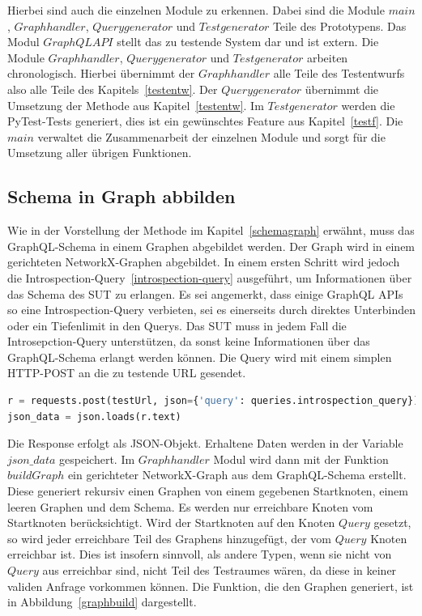 Hierbei sind auch die einzelnen Module zu erkennen.
Dabei sind die Module $main$, $Graphhandler$, $Querygenerator$ und $Testgenerator$ Teile des Prototypens.
Das Modul $GraphQL API$ stellt das zu testende System dar und ist extern.
Die Module $Graphhandler$, $Querygenerator$ und $Testgenerator$ arbeiten chronologisch.
Hierbei übernimmt der $Graphhandler$ alle Teile des Testentwurfs also alle Teile des Kapitels~\ref{testentw}.
Der $Querygenerator$ übernimmt die Umsetzung der Methode aus Kapitel~\ref{testentw}.
Im $Testgenerator$ werden die PyTest-Tests generiert, dies ist ein gewünschtes Feature aus Kapitel~\ref{testf}.
Die $main$ verwaltet die Zusammenarbeit der einzelnen Module und sorgt für die Umsetzung aller übrigen Funktionen.

\subsection{Schema in Graph abbilden}

Wie in der Vorstellung der Methode im Kapitel~\ref{schemagraph} erwähnt, muss das GraphQL-Schema in einem Graphen abgebildet werden.
Der Graph wird in einem gerichteten NetworkX-Graphen abgebildet.
In einem ersten Schritt wird jedoch die Introspection-Query~\ref{introspection-query} ausgeführt, um Informationen über das Schema des SUT zu erlangen.
Es sei angemerkt, dass einige GraphQL APIs so eine Introspection-Query verbieten, sei es einerseits durch direktes Unterbinden oder ein Tiefenlimit in den Querys.
Das SUT muss in jedem Fall die Introsepction-Query unterstützen, da sonst keine Informationen über das GraphQL-Schema erlangt werden können.
Die Query wird mit einem simplen HTTP-POST an die zu testende URL gesendet.

\begin{lstlisting}[language=Python, caption={Absenden der Introspection-Query}]
r = requests.post(testUrl, json={'query': queries.introspection_query})
json_data = json.loads(r.text)
\end{lstlisting}

Die Response erfolgt als JSON-Objekt.
Erhaltene Daten werden in der Variable $json\_data$ gespeichert.
Im $Graphhandler$ Modul wird dann mit der Funktion $buildGraph$ ein gerichteter NetworkX-Graph aus dem GraphQL-Schema erstellt.
Diese generiert rekursiv einen Graphen von einem gegebenen Startknoten, einem leeren Graphen und dem Schema.
Es werden nur erreichbare Knoten vom Startknoten berücksichtigt.
Wird der Startknoten auf den Knoten $Query$ gesetzt, so wird jeder erreichbare Teil des Graphens hinzugefügt, der vom $Query$ Knoten erreichbar ist.
Dies ist insofern sinnvoll, als andere Typen, wenn sie nicht von $Query$ aus erreichbar sind, nicht Teil des Testraumes wären, da diese in keiner validen Anfrage vorkommen können.
Die Funktion, die den Graphen generiert, ist in Abbildung~\ref{graphbuild} dargestellt.


